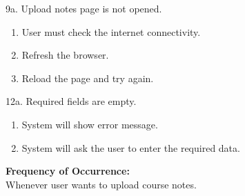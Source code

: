 \documentclass[12pt]{article}
\begin{document}
9a. Upload notes page is not opened.
\begin{enumerate}
\item User must check the internet connectivity.
\item Refresh the browser.
\item Reload the page and try again.
\end{enumerate}
12a. Required fields are empty.
\begin{enumerate}
\item System will show error message.
\item System will ask the user to enter the required data. 
\end{enumerate}
\textbf{Frequency of Occurrence:}\\
Whenever user wants to upload course notes.
\end{document}
